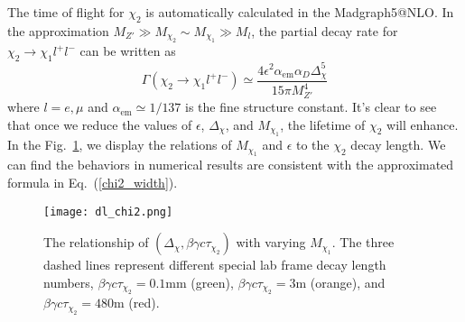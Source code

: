 \documentclass[preprint, superscriptaddress,amsmath, nofootinbib]{revtex4-1}
\begin{document}
The time of flight for $\chi_2$ is automatically calculated in the Madgraph5@NLO. In the approximation $M_{Z'}\gg M_{\chi_2}\sim M_{\chi_1}\gg M_l$, the partial decay rate for $\chi_2\rightarrow\chi_1 l^+l^-$ can be written as~\cite{Izaguirre:2015zva} 
\begin{equation} 
    \Gamma (\chi_2\rightarrow\chi_1 l^+l^-)\simeq\frac{4\epsilon^2 \alpha_{\text{em}}\alpha_D\Delta^5_{\chi}}{15\pi M_{Z'}^4} 
\label{chi2_width}    
\end{equation}
where $l = e, \mu$ and $\alpha_{\text{em}}\simeq 1/137$ is the fine structure constant. It's clear to see that once we reduce the values of $\epsilon$, $\Delta_{\chi}$, and $M_{\chi_1}$, the lifetime of $\chi_2$ will enhance.  
In the Fig.~\ref{fig:chi2_length}, we display the relations of $M_{\chi_1}$ and $\epsilon$ to the $\chi_2$ decay length. We can find the behaviors in numerical results are consistent with the approximated formula in Eq.~(\ref{chi2_width}). 

\begin{figure}[t!]
\centering
\texttt{[image: dl\_chi2.png]}
\caption{The relationship of $(\Delta_{\chi}, \beta\gamma c\tau_{\chi_2})$ with varying $M_{\chi_1}$. The three dashed lines represent different special lab frame decay length numbers, $\beta\gamma c\tau_{\chi_2} = 0.1 \text{mm}$ (green), $\beta\gamma c\tau_{\chi_2} = 3 \text{m}$ (orange), and $\beta\gamma c\tau_{\chi_2} = 480 \text{m}$ (red). }
\label{fig:chi2_length}
\end{figure}
\end{document}
